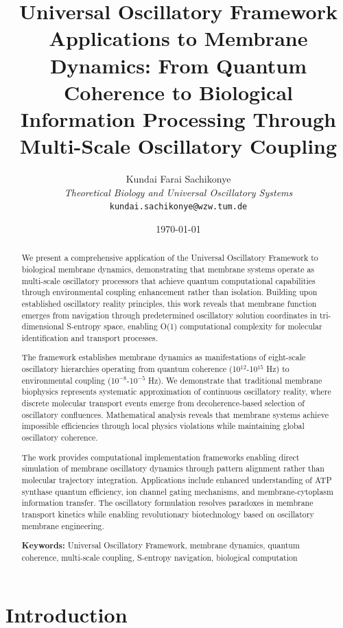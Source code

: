 \documentclass[12pt,a4paper]{article}
\title{\textbf{Universal Oscillatory Framework Applications to Membrane Dynamics: From Quantum Coherence to Biological Information Processing Through Multi-Scale Oscillatory Coupling}}
\author{
Kundai Farai Sachikonye\\
\textit{Theoretical Biology and Universal Oscillatory Systems}\\
\texttt{kundai.sachikonye@wzw.tum.de}
}
\date{\today}
\begin{document}
\maketitle

\begin{abstract}
We present a comprehensive application of the Universal Oscillatory Framework to biological membrane dynamics, demonstrating that membrane systems operate as multi-scale oscillatory processors that achieve quantum computational capabilities through environmental coupling enhancement rather than isolation. Building upon established oscillatory reality principles, this work reveals that membrane function emerges from navigation through predetermined oscillatory solution coordinates in tri-dimensional S-entropy space, enabling O(1) computational complexity for molecular identification and transport processes.

The framework establishes membrane dynamics as manifestations of eight-scale oscillatory hierarchies operating from quantum coherence (10$^{12}$-10$^{15}$ Hz) to environmental coupling (10$^{-8}$-10$^{-5}$ Hz). We demonstrate that traditional membrane biophysics represents systematic approximation of continuous oscillatory reality, where discrete molecular transport events emerge from decoherence-based selection of oscillatory confluences. Mathematical analysis reveals that membrane systems achieve impossible efficiencies through local physics violations while maintaining global oscillatory coherence.

The work provides computational implementation frameworks enabling direct simulation of membrane oscillatory dynamics through pattern alignment rather than molecular trajectory integration. Applications include enhanced understanding of ATP synthase quantum efficiency, ion channel gating mechanisms, and membrane-cytoplasm information transfer. The oscillatory formulation resolves paradoxes in membrane transport kinetics while enabling revolutionary biotechnology based on oscillatory membrane engineering.

\textbf{Keywords:} Universal Oscillatory Framework, membrane dynamics, quantum coherence, multi-scale coupling, S-entropy navigation, biological computation
\end{abstract}

\section{Introduction}
\end{document}
